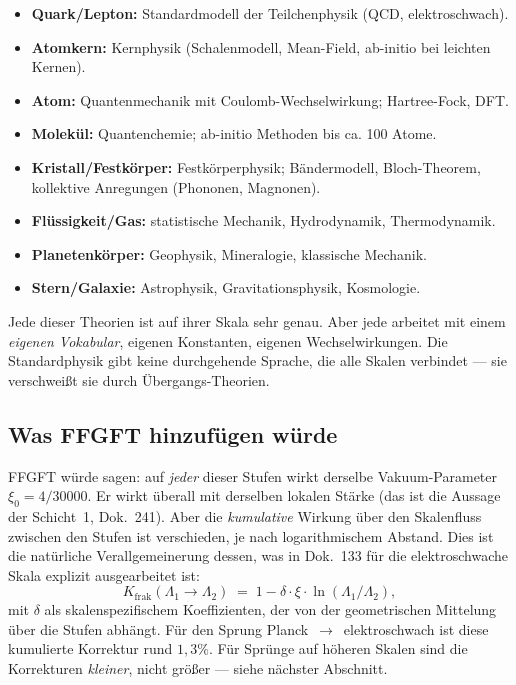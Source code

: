 \begin{itemize}\setlength\itemsep{2pt}
  \item \textbf{Quark/Lepton:} Standardmodell der Teilchenphysik (QCD,
        elektroschwach).
  \item \textbf{Atomkern:} Kernphysik (Schalenmodell, Mean-Field,
        ab-initio bei leichten Kernen).
  \item \textbf{Atom:} Quantenmechanik mit Coulomb-Wechselwirkung;
        Hartree-Fock, DFT.
  \item \textbf{Molekül:} Quantenchemie; ab-initio Methoden bis ca.
        100 Atome.
  \item \textbf{Kristall/Festkörper:} Festkörperphysik; Bändermodell,
        Bloch-Theorem, kollektive Anregungen (Phononen, Magnonen).
  \item \textbf{Flüssigkeit/Gas:} statistische Mechanik, Hydrodynamik,
        Thermodynamik.
  \item \textbf{Planetenkörper:} Geophysik, Mineralogie, klassische
        Mechanik.
  \item \textbf{Stern/Galaxie:} Astrophysik, Gravitationsphysik,
        Kosmologie.
\end{itemize}

Jede dieser Theorien ist auf ihrer Skala sehr genau. Aber jede arbeitet
mit einem \emph{eigenen Vokabular}, eigenen Konstanten, eigenen
Wechselwirkungen. Die Standardphysik gibt keine durchgehende Sprache,
die alle Skalen verbindet --- sie verschweißt sie durch Übergangs-Theorien.

\subsection*{Was FFGFT hinzufügen würde}

FFGFT würde sagen: auf \emph{jeder} dieser Stufen wirkt derselbe
Vakuum-Parameter $\xi_{0} = 4/30000$. Er wirkt überall mit derselben
lokalen Stärke (das ist die Aussage der Schicht~1, Dok.~241). Aber die
\emph{kumulative} Wirkung über den Skalenfluss zwischen den Stufen ist
verschieden, je nach logarithmischem Abstand. Dies ist die natürliche
Verallgemeinerung dessen, was in Dok.~133 für die elektroschwache
Skala explizit ausgearbeitet ist:
\[
  K_{\mathrm{frak}}(\Lambda_1 \to \Lambda_2) \;=\; 1 - \delta\!\cdot\!\xi\cdot\ln(\Lambda_1/\Lambda_2),
\]
mit $\delta$ als skalenspezifischem Koeffizienten, der von der
geometrischen Mittelung über die Stufen abhängt. Für den Sprung
Planck~$\to$~elektroschwach ist diese kumulierte Korrektur rund
$1{,}3\%$. Für Sprünge auf höheren Skalen sind die Korrekturen
\emph{kleiner}, nicht größer --- siehe nächster Abschnitt.

